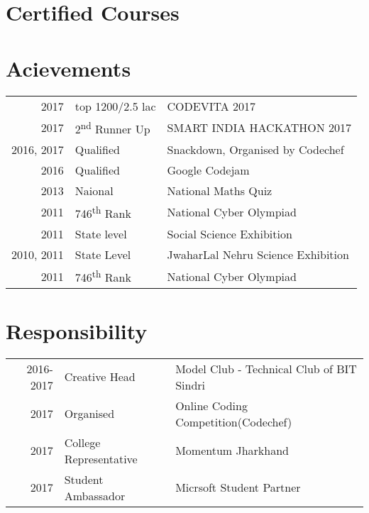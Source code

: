 \documentclass[a4paper]{deedy-resume} %
\begin{document}
\section{Certified Courses}
\sectionspace %

\section{Acievements} 

\begin{tabular}{rll}
2017	 & top 1200/2.5 lac & CODEVITA 2017 \\
2017	 & 2\textsuperscript{nd} Runner Up &  SMART INDIA HACKATHON 2017\\
2016, 2017	 & Qualified & Snackdown, Organised by Codechef\\
2016	 & Qualified & Google Codejam\\
2013 & Naional & National Maths Quiz\\
2011 & 746\textsuperscript{th} Rank & National Cyber Olympiad\\
2011 & State level & Social Science Exhibition \\
2010, 2011 & State Level & JwaharLal Nehru Science Exhibition\\
2011 & 746\textsuperscript{th} Rank & National Cyber Olympiad\\
\end{tabular}

\sectionspace %


\section{Responsibility} 

\begin{tabular}{rll}
2016-2017 & Creative Head & Model Club - Technical Club of BIT Sindri\\
2017 & Organised & Online Coding Competition(Codechef)\\
2017 & College Representative & Momentum Jharkhand\\
2017 & Student Ambassador & Micrsoft Student Partner\\
\end{tabular}
\end{document}
